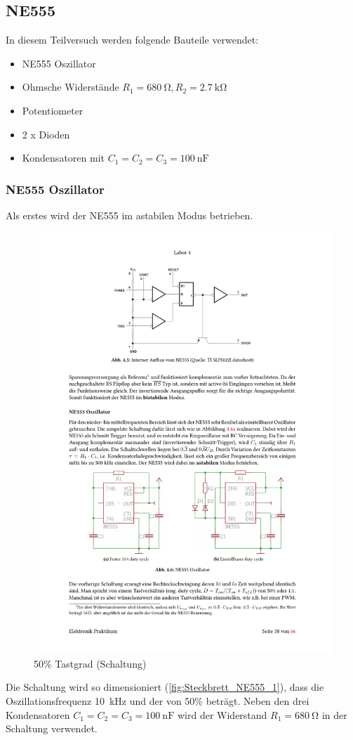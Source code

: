 \subsection{NE555}
%
In diesem Teilversuch werden folgende Bauteile verwendet:
%
\begin{itemize}
    \item NE555 Oszillator
    \item Ohmsche Widerstände $R_1=\SI{680}{\ohm},R_2=\SI{2,7}{\kilo \ohm}$
    \item Potentiometer
    \item 2 x Dioden
    \item Kondensatoren mit $C_1=C_2=C_3=\SI{100}{\nano\farad}$
\end{itemize}

\subsubsection{NE555 Oszillator}
Als erstes wird der NE555 im astabilen Modus betrieben. 

\begin{figure}[H]
  \centering
  \includegraphics[width=0.5\linewidth]{Elektronik-Laborprotokoll_Filter/Abbildungen/Schaltungen_Skript/Schaltung_NE555_astabile_Kippstufe.pdf}
  \caption{50\% Tastgrad (Schaltung)\cite{Skript}}
  \label{fig:astabiler_Modus}
\end{figure}


Die Schaltung wird so dimensioniert (\ref{fig:Steckbrett_NE555_1}), dass die Oszillationsfrequenz \SI{10}{\kilo\hertz} und der von 50\% beträgt. Neben den drei Kondensatoren $C_1=C_2=C_3=\SI{100}{\nano\farad}$ wird der Widerstand  $R_1=\SI{680}{\ohm}$ in der Schaltung verwendet.

